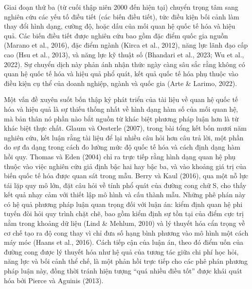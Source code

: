 \documentclass[
  a4paper,
  13pt]{extreport}
\begin{document}
Giai đoạn thứ ba (từ cuối thập niên 2000 đến hiện tại) chuyển trọng tâm
sang nghiên cứu các yếu tố điều tiết (các biến điều tiết), tức điều kiện
bối cảnh làm thay đổi hình dạng, cường độ, hoặc dấu của mối quan hệ quốc
tế hóa và hiệu quả. Các biến điều tiết được nghiên cứu bao gồm đặc điểm
quốc gia nguồn (Marano et al., 2016), đặc điểm ngành (Kirca et al.,
2012), năng lực lãnh đạo cấp cao (Hsu et al., 2013), và năng lực kỹ
thuật số (Bhandari et al., 2023; Wu et al., 2022). Sự chuyển dịch này
phản ánh nhận thức ngày càng sâu sắc rằng không có quan hệ quốc tế hóa
và hiệu quả phổ quát, kết quả quốc tế hóa phụ thuộc vào điều kiện cụ thể
của doanh nghiệp, ngành và quốc gia (Arte \& Larimo, 2022).

Một vấn đề xuyên suốt bốn thập kỷ phát triển của tài liệu về quan hệ
quốc tế hóa và hiệu quả là sự thiếu thống nhất về hình dạng hàm số của
mối quan hệ, mà bản thân nó phần nào bắt nguồn từ khác biệt phương pháp
luận hơn là từ khác biệt thực chất. Glaum và Oesterle (2007), trong bài
tổng kết bốn mươi năm nghiên cứu, kết luận rằng tài liệu để lại nhiều
câu hỏi hơn câu trả lời, một phần do sự đa dạng trong cách đo lường mức
độ quốc tế hóa và cách định dạng hàm hồi quy. Thomas và Eden (2004) chỉ
ra trực tiếp rằng hình dạng quan hệ phụ thuộc vào việc nghiên cứu giả
định bậc hai hay bậc ba, và vào khoảng giá trị của biến quốc tế hóa được
quan sát trong mẫu. Berry và Kaul (2016), qua một nỗ lực tái lặp quy mô
lớn, đặt câu hỏi về tính phổ quát của đường cong chữ S, cho thấy kết quả
nhạy cảm với thiết lập mô hình và cấu thành mẫu. Những phê phán này có
hệ quả phương pháp luận quan trọng đối với luận án: kiểm định quan hệ
phi tuyến đòi hỏi quy trình chặt chẽ, bao gồm kiểm định sự tồn tại của
điểm cực trị nằm trong khoảng dữ liệu (Lind \& Mehlum, 2010) và lý
thuyết hóa cẩn trọng về cơ chế tạo ra độ cong thay vì chỉ đưa số hạng
bình phương vào mô hình một cách máy móc (Haans et al., 2016). Cách tiếp
cận của luận án, theo đó điểm uốn của đường cong được lý thuyết hóa như
hệ quả của tương tác giữa chi phí học hỏi, năng lực và bối cảnh thể chế,
là một phản hồi trực tiếp cho các phê phán phương pháp luận này, đồng
thời tránh hiện tượng ``quá nhiều điều tốt'' được khái quát hóa bởi
Pierce và Aguinis (2013).
\end{document}
